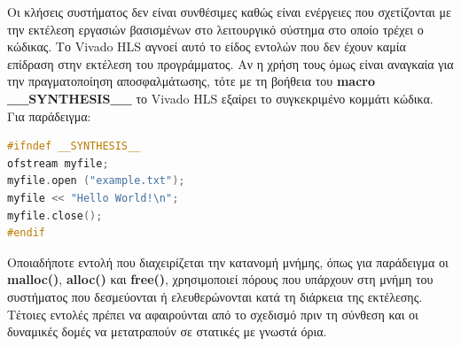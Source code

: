 Οι κλήσεις συστήματος δεν είναι συνθέσιμες καθώς είναι ενέργειες που σχετίζονται με την εκτέλεση εργασιών βασισμένων στο λειτουργικό σύστημα στο οποίο τρέχει ο κώδικας. Το Vivado HLS αγνοεί αυτό το είδος εντολών που δεν έχουν καμία επίδραση στην εκτέλεση του προγράμματος. Αν η χρήση τους όμως είναι αναγκαία για την πραγματοποίηση αποσφαλμάτωσης, τότε με τη βοήθεια του \textbf{macro \_\_SYNTHESIS\_\_} το Vivado HLS εξαίρει το συγκεκριμένο κομμάτι κώδικα. Για παράδειγμα:
\begin{lstlisting}[language=C++,belowskip=-1.2 \baselineskip]
#ifndef __SYNTHESIS__
ofstream myfile;
myfile.open ("example.txt");
myfile << "Hello World!\n";
myfile.close();
#endif
\end{lstlisting}

Οποιαδήποτε εντολή που διαχειρίζεται την κατανομή μνήμης, όπως για παράδειγμα οι \textbf{malloc()}, \textbf{alloc()} και \textbf{free()}, χρησιμοποιεί πόρους που υπάρχουν στη μνήμη του συστήματος που δεσμεύονται ή ελευθερώνονται κατά τη διάρκεια της εκτέλεσης. Τέτοιες εντολές πρέπει να αφαιρούνται από το σχεδισμό πριν τη σύνθεση και οι δυναμικές δομές να μετατραπούν σε στατικές με γνωστά όρια.

